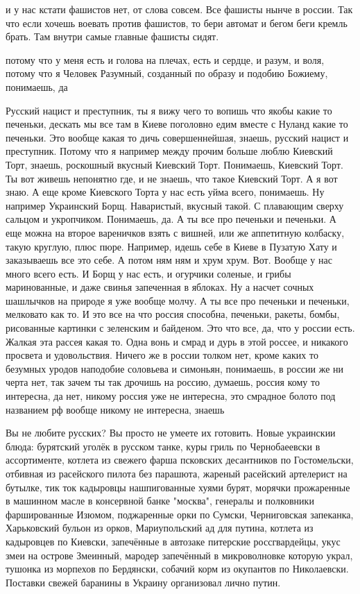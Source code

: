 и у нас кстати фашистов нет, от слова совсем. Все фашисты нынче в россии. Так
что если хочешь воевать против фашистов, то бери автомат и бегом беги кремль
брать. Там внутри самые главные фашисты сидят.

потому что у меня есть и голова на плечах, есть и сердце, и разум, и воля,
потому что я Человек Разумный, созданный по образу и подобию Божиему,
понимаешь, да

Русский нацист и преступник, ты я вижу чего то вопишь что якобы какие то
печеньки, дескать мы все там в Киеве поголовно едим вместе с Нуланд какие то
печеньки. Это вообще какая то дичь совершеннейшая, знаешь, русский нацист и
преступник. Потому что я например между прочим больше люблю Киевский Торт,
знаешь, роскошный вкусный Киевский Торт. Понимаешь, Киевский Торт. Ты вот
живешь непонятно где, и не знаешь, что такое Киевский Торт. А я вот знаю. А еще
кроме Киевского Торта у нас есть уйма всего, понимаешь. Ну например Украинский
Борщ. Наваристый, вкусный такой. С плавающим сверху сальцом и укропчиком.
Понимаешь, да. А ты все про печеньки и печеньки. А еще можна на второе
вареничков взять с вишней, или же аппетитную колбаску, такую круглую, плюс
пюре. Например, идешь себе в Киеве в Пузатую Хату и заказываешь все это себе. А
потом ням ням и хрум хрум. Вот.  Вообще у нас много всего есть. И Борщ у нас
есть, и огурчики соленые, и грибы маринованные, и даже свинья запеченная в
яблоках. Ну а насчет сочных шашлычков на природе я уже вообще молчу. А ты все
про печеньки и печеньки, мелковато как то. И это все на что россия способна,
печеньки, ракеты, бомбы, рисованные картинки с зеленским и байденом. Это что
все, да, что у россии есть. Жалкая эта рассея какая то. Одна вонь и смрад и
дурь в этой россее, и никакого просвета и удовольствия. Ничего же в россии
толком нет, кроме каких то безумных уродов наподобие соловьева и симоньян,
понимаешь, в россии же ни черта нет, так зачем ты так дрочишь на россию,
думаешь, россия кому то интересна, да нет, никому россия уже не интересна, это
смрадное болото под названием рф вообще никому не интересна, знаешь

Вы не любите русских? Вы просто не умеете их готовить. Новые украинскии блюда:
бурятский уголёк в русском танке, куры гриль по Чернобаеевски в ассортименте,
котлета из свежего фарша псковских десантников по Гостомельски, отбивная из
расейского пилота без парашюта, жареный расейский артелерист на бутылке, тик
ток кадыровцы нашпигованные хуями бурят, морячки прожаренные в машинном масле в
консервной банке "москва", генералы и полковники фаршированные Изюмом,
поджаренные орки по Сумски, Черниговская запеканка, Харьковский бульон из
орков, Мариупольский ад для путина, котлета из кадыровцев по Киевски,
запечённые в автозаке питерские россгвардейцы, укус змеи на острове Змеинный,
мародер запечённый в микроволновке которую украл, тушонка из морпехов по
Бердянски, собачий корм из окупантов по Николаевски. Поставки свежей баранины в
Украину организовал лично путин.


